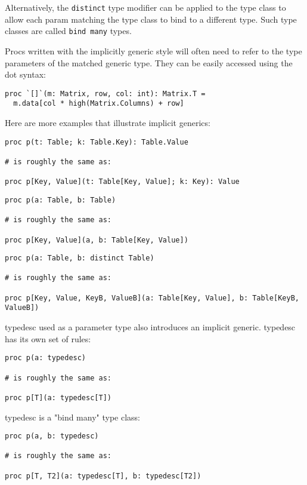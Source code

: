 Alternatively, the \texttt{distinct} type modifier can be applied to the
type class to allow each param matching the type class to bind to a
different type. Such type classes are called \texttt{bind\ many} types.

Procs written with the implicitly generic style will often need to refer
to the type parameters of the matched generic type. They can be easily
accessed using the dot syntax:

\begin{verbatim}
proc `[]`(m: Matrix, row, col: int): Matrix.T =
  m.data[col * high(Matrix.Columns) + row]
\end{verbatim}

Here are more examples that illustrate implicit generics:

\begin{verbatim}
proc p(t: Table; k: Table.Key): Table.Value

# is roughly the same as:

proc p[Key, Value](t: Table[Key, Value]; k: Key): Value
\end{verbatim}

\begin{verbatim}
proc p(a: Table, b: Table)

# is roughly the same as:

proc p[Key, Value](a, b: Table[Key, Value])
\end{verbatim}

\begin{verbatim}
proc p(a: Table, b: distinct Table)

# is roughly the same as:

proc p[Key, Value, KeyB, ValueB](a: Table[Key, Value], b: Table[KeyB, ValueB])
\end{verbatim}

{typedesc} used as a parameter type also introduces an implicit generic.
{typedesc} has its own set of rules:

\begin{verbatim}
proc p(a: typedesc)

# is roughly the same as:

proc p[T](a: typedesc[T])
\end{verbatim}

{typedesc} is a "bind many" type class:

\begin{verbatim}
proc p(a, b: typedesc)

# is roughly the same as:

proc p[T, T2](a: typedesc[T], b: typedesc[T2])
\end{verbatim}

